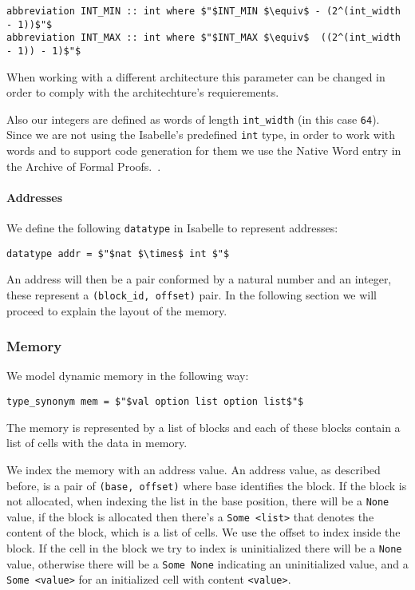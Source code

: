 \begin{lstlisting}[frame=single, mathescape=true]
abbreviation INT_MIN :: int where $"$INT_MIN $\equiv$ - (2^(int_width - 1))$"$
abbreviation INT_MAX :: int where $"$INT_MAX $\equiv$  ((2^(int_width - 1)) - 1)$"$
\end{lstlisting}

When working with a different architecture this parameter can be changed in order to comply with the architechture's requierements.

Also our integers are defined as words of length \verb|int_width| (in this case \verb|64|).
Since we are not using the Isabelle's predefined \verb|int| type, in order to work with words and to support code generation for them we use the Native Word entry in the Archive of Formal Proofs.~\parencite{Native_Word-AFP}.


\paragraph{Addresses}

We define the following \verb|datatype| in Isabelle to represent addresses:

\begin{lstlisting}[frame=single, mathescape=true]
datatype addr = $"$nat $\times$ int $"$
\end{lstlisting}

An address will then be a pair conformed by a natural number and an integer, these represent a \verb|(block_id, offset)| pair.
In the following section we will proceed to explain the layout of the memory.

\subsubsection{Memory}

We model dynamic memory in the following way:

\begin{lstlisting}[frame=single, mathescape=true]
type_synonym mem = $"$val option list option list$"$
\end{lstlisting}

The memory is represented by a list of blocks and each of these blocks contain a list of cells with the data in memory.

We index the memory with an address value.
An address value, as described before, is a pair of \verb|(base, offset)| where base identifies the block.
If the block is not allocated, when indexing the list in the base position, there will be a \verb|None| value, if the block is allocated then there's a \verb|Some <list>| that denotes the content of the block, which is a list of cells.
We use the offset to index inside the block.
If the cell in the block we try to index is uninitialized there will be a \verb|None| value, otherwise there will be a \verb|Some None| indicating an uninitialized value, and a \verb|Some <value>| for an initialized cell with content \verb|<value>|.


